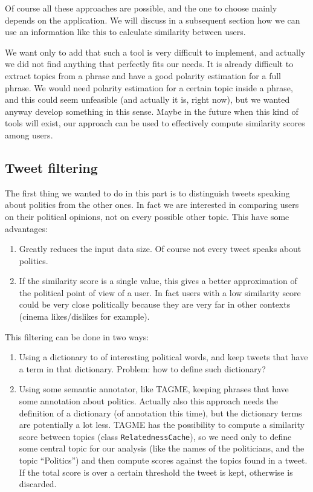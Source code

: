\documentclass[a4paper,11pt,oneside]{article}
\begin{document}
Of course all these approaches are possible, and the one to choose mainly depends on the application. We will discuss in a subsequent section how we can use an information like this to calculate similarity between users.

We want only to add that such a tool is very difficult to implement, and actually we did not find anything that perfectly fits our needs. It is already difficult to extract topics from a phrase and have a good polarity estimation for a full phrase. We would need polarity estimation for a certain topic inside a phrase, and this could seem unfeasible (and actually it is, right now), but we wanted anyway develop something in this sense.
Maybe in the future when this kind of tools will exist, our approach can be used to effectively compute similarity scores among users.

\subsection{Tweet filtering}
The first thing we wanted to do in this part is to distinguish tweets speaking about politics from the other ones. In fact we are interested in comparing users on their political opinions, not on every possible other topic. This have some advantages:
\begin{enumerate}
\item Greatly reduces the input data size. Of course not every tweet speaks about politics.
\item If the similarity score is a single value, this gives a better approximation of the political point of view of a user. In fact users with a low similarity score could be very close politically because they are very far in other contexts (cinema likes/dislikes for example).
\end{enumerate}

This filtering can be done in two ways:
\begin{enumerate}
\item Using a dictionary to of interesting political words, and keep tweets that have a term in that dictionary. Problem:  how to define such dictionary?
\item Using some semantic annotator, like TAGME, keeping phrases that have some annotation about politics. Actually also this approach needs the definition of a dictionary (of annotation this time), but the dictionary terms are potentially a lot less. TAGME has the possibility to compute a similarity score between topics (class \texttt{RelatednessCache}), so we need only to define some central topic for our analysis (like the names of the politicians, and the topic ``Politics'') and then compute scores against the topics found in a tweet. If the total score is over a certain threshold the tweet is kept, otherwise is discarded.
\end{enumerate}
\end{document}

